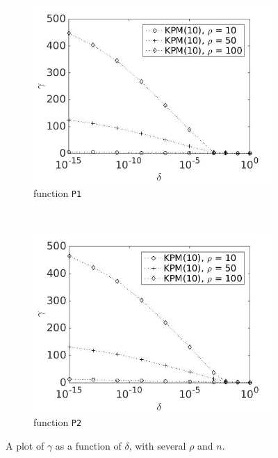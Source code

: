 \begin{figure}[H]
        \begin{subfigure}[b]{0.45\textwidth}
                \includegraphics[width=\textwidth]{fig/s13antvstol1m10}
                \caption{function \texttt{P1}}
                \label{fig:gammadelta3}
        \end{subfigure}
~
        \begin{subfigure}[b]{0.45\textwidth}
                \includegraphics[width=\textwidth]{fig/s14antvstol2m10}
                \caption{ function \texttt{P2}}
                \label{fig:gammadelta4}
        \end{subfigure}
        
        \caption{A plot of $\gamma$ as a function of $\delta$, with several $\rho$ and $n$.} \label{fig:gammadelta}
\end{figure}
